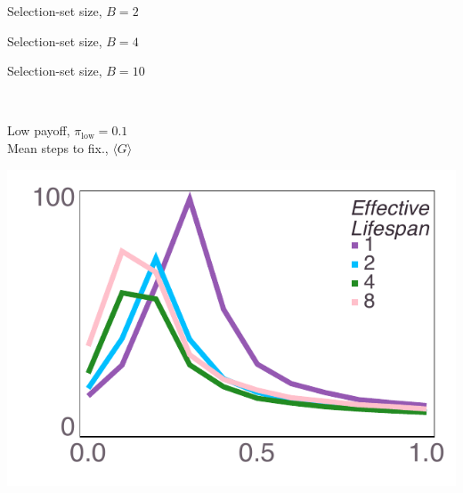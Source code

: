 \documentclass[varwidth=true,crop=false]{standalone}
\newcommand{\pisub}[1]{\pi_{\mathrm{#1}}}
\newcommand{\pilow}{\pisub{low}}
\newcommand{\meanvar}[1]{\langle #1 \rangle}
\newcommand{\meanG}{\meanvar{G}}
\begin{document}
    \begin{minipage}{3.75in}
      \centering
      {\hspace{5.25em}\huge Selection-set size, $B = 2$}
    \end{minipage}%
    \begin{minipage}{3.75in}
      \centering
      {\hspace{5.25em}\huge Selection-set size, $B = 4$}
    \end{minipage}%
    \begin{minipage}{3.75in}
      \centering
      {\hspace{5.25em}\huge Selection-set size, $B = 10$}
    \end{minipage}~\\

    \begin{minipage}{3.75in}
    \begin{rotate}{90}
      {\parbox{3.0in}{
          \centering
          \vspace{-1.0em}\hspace{-2.5em} {\huge Low payoff, $\pilow = 0.1$} \\[1em]
          {\huge Mean steps to fix., $\meanG$}
      }}
    \end{rotate}%
    \hspace{2em}
      \includegraphics[width=\textwidth]{Figures/step_over_u_lowpayoff=0.1_nbehaviors=2.pdf}
    \end{minipage}\noindent\hspace{1.25em}
\end{document}

